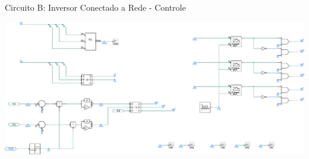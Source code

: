 \begin{frame}{Circuito B: Inversor Conectado a Rede - Controle}
\centering


\includegraphics[width=0.75\linewidth]{./figuras/Terceiro-Circuito/SIM6b_CTRL}


\end{frame}



